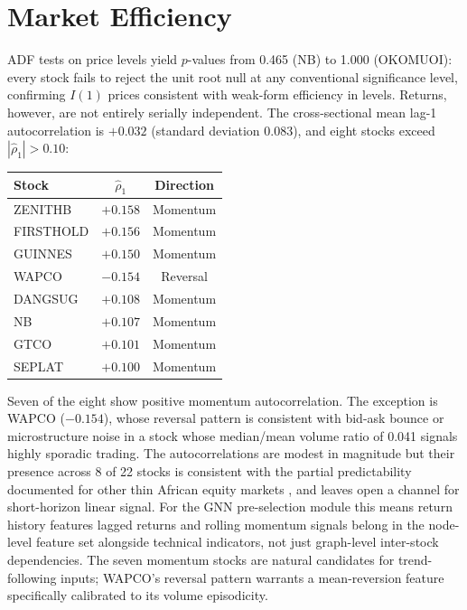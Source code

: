 \documentclass[twoside,11pt]{article}
\begin{document}
	\section{Market Efficiency}
	\label{sec:efficiency}
	
	ADF tests on price levels yield $p$-values from 0.465 (NB) to 1.000 (OKOMUOI): every stock fails to reject the unit root null at any conventional significance level, confirming $I(1)$ prices consistent with weak-form efficiency in levels. Returns, however, are not entirely serially independent. The cross-sectional mean lag-1 autocorrelation is $+0.032$ (standard deviation 0.083), and eight stocks exceed $|\hat{\rho}_1| > 0.10$:
	
	\begin{center}
		\small
		\begin{tabular}{lcc}
			\toprule
			\textbf{Stock} & $\hat{\rho}_1$ & \textbf{Direction}\\
			\midrule
			ZENITHB    & $+0.158$ & Momentum\\
			FIRSTHOLD  & $+0.156$ & Momentum\\
			GUINNES    & $+0.150$ & Momentum\\
			WAPCO      & $-0.154$ & Reversal\\
			DANGSUG    & $+0.108$ & Momentum\\
			NB         & $+0.107$ & Momentum\\
			GTCO       & $+0.101$ & Momentum\\
			SEPLAT     & $+0.100$ & Momentum\\
			\bottomrule
		\end{tabular}
	\end{center}
	
	Seven of the eight show positive momentum autocorrelation. The
	exception is WAPCO ($-0.154$), whose reversal pattern is consistent with bid-ask bounce or microstructure noise in a stock whose median/mean volume ratio of 0.041 signals highly sporadic trading. The autocorrelations are modest in magnitude but their presence across 8 of 22 stocks is consistent with the partial predictability documented for other thin African equity markets \citep{ferrouhi2021calendar}, and leaves open a channel for short-horizon linear signal. For the GNN pre-selection module this means return history features lagged returns and rolling momentum signals belong in the node-level feature set alongside technical indicators, not just graph-level inter-stock dependencies. The seven momentum stocks are natural candidates for trend-following inputs; WAPCO's reversal pattern warrants a mean-reversion feature specifically calibrated to its volume episodicity.
	
\end{document}
